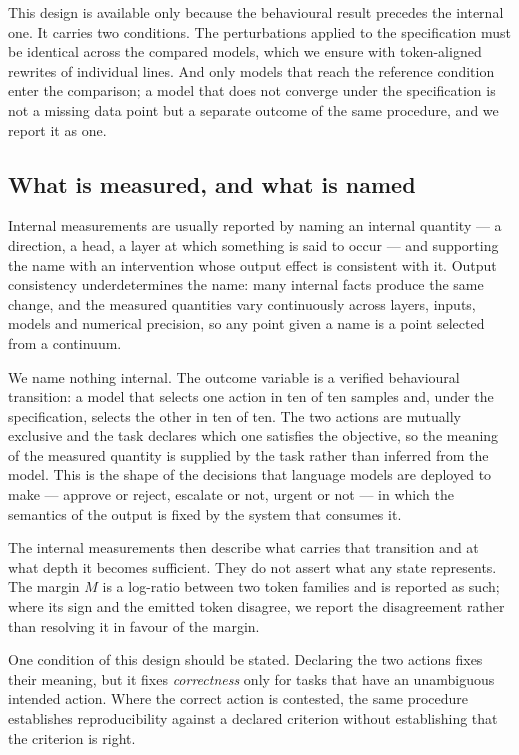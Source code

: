 This design is available only because the behavioural result precedes the internal
one. It carries two conditions. The perturbations applied to the specification must
be identical across the compared models, which we ensure with token-aligned rewrites
of individual lines. And only models that reach the reference condition enter the
comparison; a model that does not converge under the specification is not a missing
data point but a separate outcome of the same procedure, and we report it as one.

\subsection{What is measured, and what is named}
\label{sec:design-naming}

Internal measurements are usually reported by naming an internal quantity --- a
direction, a head, a layer at which something is said to occur --- and supporting the
name with an intervention whose output effect is consistent with it. Output
consistency underdetermines the name: many internal facts produce the same change,
and the measured quantities vary continuously across layers, inputs, models and
numerical precision, so any point given a name is a point selected from a continuum.

We name nothing internal. The outcome variable is a verified behavioural transition:
a model that selects one action in ten of ten samples and, under the specification,
selects the other in ten of ten. The two actions are mutually exclusive and the task
declares which one satisfies the objective, so the meaning of the measured quantity
is supplied by the task rather than inferred from the model. This is the shape of the
decisions that language models are deployed to make --- approve or reject, escalate
or not, urgent or not --- in which the semantics of the output is fixed by the system
that consumes it.

The internal measurements then describe what carries that transition and at what
depth it becomes sufficient. They do not assert what any state represents. The margin
$M$ is a log-ratio between two token families and is reported as such; where its sign
and the emitted token disagree, we report the disagreement rather than resolving it
in favour of the margin.

One condition of this design should be stated. Declaring the two actions fixes their
meaning, but it fixes \emph{correctness} only for tasks that have an unambiguous
intended action. Where the correct action is contested, the same procedure establishes
reproducibility against a declared criterion without establishing that the criterion
is right.


